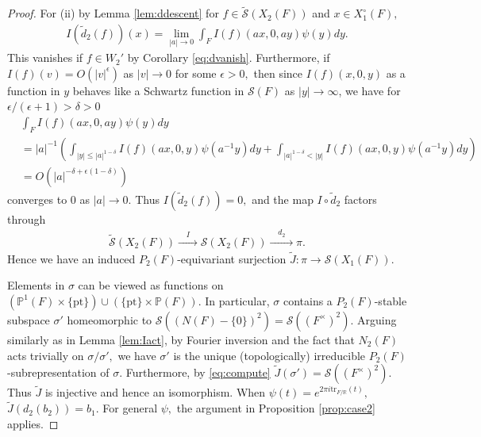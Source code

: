 \documentclass[11pt,a4paper,reqno]{amsart}
\theoremstyle{remark}
\numberwithin{equation}{section}
\newcommand{\RR}{\mathbb{R}}
\theoremstyle{definition}
\numberwithin{equation}{section}
\begin{document}
\begin{proof}
    For (ii) by Lemma \ref{lem:ddescent} for $f\in \widetilde{\mathcal{S}}(X_{2}(F))$ and $x\in X_{1}^\circ(F),$
         \begin{align}\label{eq:compute}
        I(\tilde{d}_2(f))(x)=\lim_{|a|\to 0} \int_{F} I(f)(ax,0,ay) \psi(y)dy.
    \end{align}
    This vanishes if $f\in W_{2}'$ by Corollary \ref{eq:dvanish}. Furthermore, if $I(f)(v)=O(|v|^{\epsilon})$ as $|v|\to 0$ for some $\epsilon>0,$ then since $I(f)(x,0,y)$ as a function in $y$ behaves like a Schwartz function in $\mathcal{S}(F)$ as $|y|\to \infty$, we have for $\epsilon/(\epsilon+1)>\delta>0$
    \begin{align*}
        &\int_{F} I(f)(ax,0,ay) \psi(y)dy\\
        &=|a|^{-1}\left(\int_{|y|\le |a|^{1-\delta}} I(f)(ax,0,y)\psi(a^{-1}y)dy+\int_{|a|^{1-\delta}<|y|} I(f)(ax,0,y)\psi(a^{-1}y)dy\right)\\
        &=O(|a|^{-\delta+\epsilon(1-\delta)})
    \end{align*}
    converges to $0$ as $|a|\to 0.$ Thus $I(\tilde{d}_2(f))=0,$ and the map $I\circ \tilde{d}_2$ factors through 
    \begin{align*}
        \widetilde{\mathcal{S}}(X_2(F))\xrightarrow{\quad I\quad} \mathcal{S}(X_2(F))\xrightarrow{\quad  d_2\quad } \pi.
    \end{align*}
    Hence we have an induced $P_2(F)$-equivariant surjection $\tilde{J}:\pi\to \mathcal{S}(X_1(F)).$ 

    Elements in $\sigma$ can be viewed as functions on $(\mathbb{P}^1(F)\times \{\mathrm{pt}\})\cup (\{\mathrm{pt}\}\times\mathbb{P}(F))$. In particular, $\sigma$ contains a $P_2(F)$-stable subspace $\sigma'$ homeomorphic to $\mathcal{S}((N(F)-\{0\})^2)=\mathcal{S}((F^\times)^2)$. Arguing similarly as in Lemma \ref{lem:Iact}, by Fourier inversion and the fact that $N_2(F)$ acts trivially on $\sigma/\sigma',$ we have $\sigma'$ is the unique (topologically) irreducible $P_2(F)$-subrepresentation of $\sigma$. Furthermore, by \eqref{eq:compute} $\tilde{J}(\sigma')=\mathcal{S}((F^\times)^2).$ Thus $\tilde{J}$ is injective and hence an isomorphism. When $\psi(t)=e^{2\pi i\mathrm{tr}_{F/\RR}(t)},$ $\tilde{J}(d_2(b_2))=b_1.$ For general $\psi,$ the argument in Proposition \ref{prop:case2} applies.
\end{proof}
\end{document}
